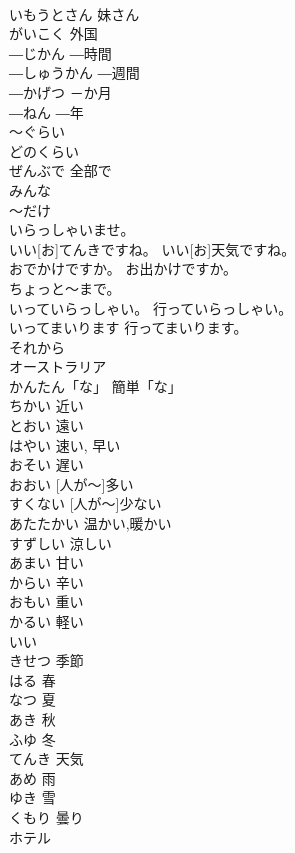 \documentclass[8pt]{extreport}
\begin{document}
\begin{CJK}{UTF8}{min}
\\	いもうとさん	妹さん	
\\	がいこく	外国	
\\	―じかん	―時間	
\\	―しゅうかん	―週間	
\\	―かげつ	－か月	
\\	―ねん	―年	
\\	～ぐらい			
\\	どのくらい			
\\	ぜんぶで	全部で	
\\	みんな			
\\	～だけ			
\\	いらっしゃいませ。			
\\	いい[お]てんきですね。	いい[お]天気ですね。	
\\	おでかけですか。	お出かけですか。	
\\	ちょっと～まで。			
\\	いっていらっしゃい。	行っていらっしゃい。	
\\	いってまいります	行ってまいります。	
\\	それから			
\\	オーストラリア			
\\	かんたん「な」	簡単「な」	
\\	ちかい	近い	
\\	とおい	遠い	
\\	はやい	速い, 早い	
\\	おそい	遅い	
\\	[ひとが～] おおい	[人が～]多い	
\\	[ひとが～]すくない	[人が～]少ない	
\\	あたたかい	温かい,暖かい	
\\	すずしい	涼しい	
\\	あまい	甘い	
\\	からい	辛い	
\\	おもい	重い	
\\	かるい	軽い	
\\	[コーヒーが～]いい			
\\	きせつ	季節	
\\	はる	春	
\\	なつ	夏	
\\	あき	秋	
\\	ふゆ	冬	
\\	てんき	天気	
\\	あめ	雨	
\\	ゆき	雪	
\\	くもり	曇り	
\\	ホテル			

\end{CJK}
\end{document}
